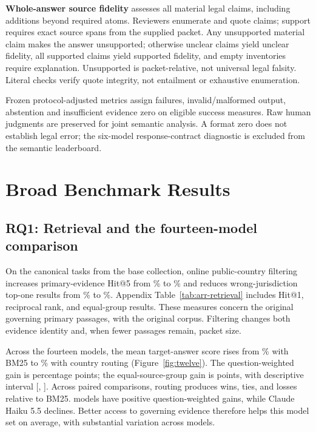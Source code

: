 \documentclass[11pt]{article}
\DeclareRobustCommand{\claim}[2]{#2}
\begin{document}
\claim{HUMANMETRICS}{\textbf{Whole-answer source fidelity} assesses all material legal claims, including additions beyond required atoms. Reviewers enumerate and quote claims; support requires exact source spans from the supplied packet. Any unsupported material claim makes the answer unsupported; otherwise unclear claims yield unclear fidelity, all supported claims yield supported fidelity, and empty inventories require explanation. Unsupported is packet-relative, not universal legal falsity. Literal checks verify quote integrity, not entailment or exhaustive enumeration.}

\claim{HUMANMETRICS}{Frozen protocol-adjusted metrics assign failures, invalid/malformed output, abstention and insufficient evidence zero on eligible success measures. Raw human judgments are preserved for joint semantic analysis. A format zero does not establish legal error; the six-model response-contract diagnostic is excluded from the semantic leaderboard.}



\section{Broad Benchmark Results}

\subsection{RQ1: Retrieval and the fourteen-model comparison}
\claim{RQONE}{On the \RNARRCore{} canonical tasks from the base collection, online public-country filtering increases primary-evidence Hit@5 from \RBMHit\% to \RRouteHit\% and reduces wrong-jurisdiction top-one results from \RBMWrong\% to \RRouteWrong\%. Appendix Table~\ref{tab:arr-retrieval} includes Hit@1, reciprocal rank, and equal-group results. These measures concern the original governing primary passages, with the original corpus. Filtering changes both evidence identity and, when fewer passages remain, packet size.}



\claim{BROADMODEL}{Across the fourteen models, the mean target-answer score rises from \RBroadBM\% with BM25 to \RBroadRoute\% with country routing (Figure~\ref{fig:twelve}). The question-weighted gain is \RBroadGain{} percentage points; the equal-source-group gain is \RBroadGroupGain{} points, with descriptive interval [\RBroadLow{}, \RBroadHigh{}]. Across \RNModelPairs{} paired comparisons, routing produces \RRoutingWins{} wins, \RRoutingTies{} ties, and \RRoutingLosses{} losses relative to BM25. \RNPositive{} models have positive question-weighted gains, while Claude Haiku 5.5 declines. Better access to governing evidence therefore helps this model set on average, with substantial variation across models.}
\end{document}
